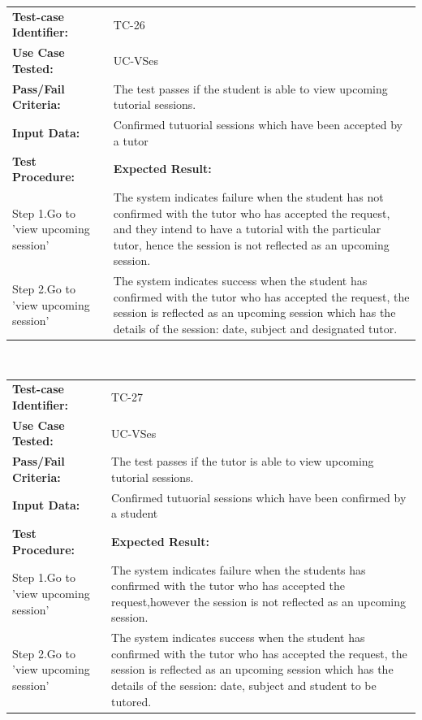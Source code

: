 \documentclass[12pt]{article}
\begin{document}
\begin{tabular}{| p{8cm} | p{8cm} |} \hline
	\textbf{Test-case Identifier:}& TC-26\\
	\textbf{Use Case Tested:}& UC-VSes\\
	\textbf{Pass/Fail Criteria:}& The test passes if the student is able to view upcoming tutorial sessions.\\
	\textbf{Input Data:}& Confirmed tutuorial sessions which have been accepted by a tutor\\\hline
	\textbf{Test Procedure:}& \textbf{Expected Result:} \\\hline
	Step 1.Go to 'view upcoming session' & The system indicates failure when the student has not confirmed with the tutor who has accepted the request, and they intend to have a tutorial with the particular tutor, hence the session is not reflected as an upcoming session. \\
	Step 2.Go to 'view upcoming session' & The system indicates success when the student has confirmed with the tutor who has accepted the request, the session is reflected as an upcoming session which has the details of the session: date, subject and designated tutor. \\
		\hline
\end{tabular}
\\

\begin{tabular}{| p{8cm} | p{8cm} |} \hline
	\textbf{Test-case Identifier:}& TC-27\\
	\textbf{Use Case Tested:}& UC-VSes\\
	\textbf{Pass/Fail Criteria:}& The test passes if the tutor is able to view upcoming tutorial sessions.\\
	\textbf{Input Data:}& Confirmed tutuorial sessions which have been confirmed by a student\\\hline
	\textbf{Test Procedure:}& \textbf{Expected Result:} \\\hline
	Step 1.Go to 'view upcoming session' & The system indicates failure when the students has confirmed with the tutor who has accepted the request,however the session is not reflected as an upcoming session. \\
	Step 2.Go to 'view upcoming session' & The system indicates success when the student has confirmed with the tutor who has accepted the request, the session is reflected as an upcoming session which has the details of the session: date, subject and student to be tutored. \\
		\hline
\end{tabular}
\\
\end{document}
